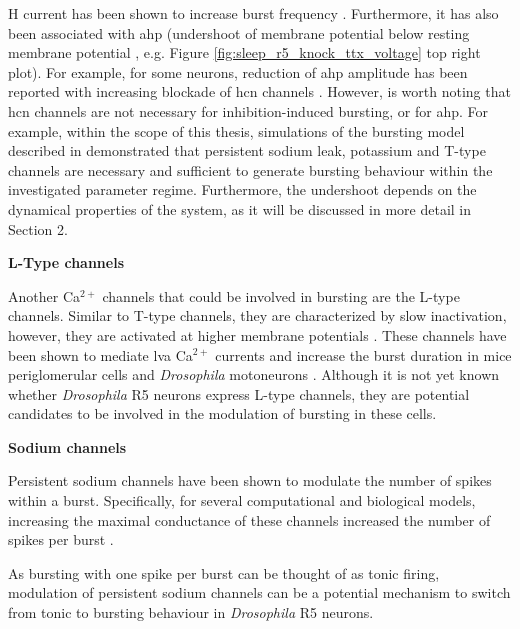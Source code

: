 \documentclass[../main.tex]{subfiles}
\begin{document}
H current has been shown to increase burst frequency \parencite{liuMultipleConductancesCooperatively2008,mccormickModelElectrophysiologicalProperties1992}.
Furthermore, it has also been associated with \gls{ahp} (undershoot of membrane potential below resting membrane potential \parencite{mccormickModelElectrophysiologicalProperties1992}, e.g. Figure \ref{fig:sleep_r5_knock_ttx_voltage} top right plot). For example, for some neurons, reduction of \gls{ahp} amplitude has been reported with increasing blockade of \gls{hcn} channels \parencite{oswaldIHCurrentGenerates2009,boninHyperpolarizationActivatedCurrentIh2013}.
However, is worth noting that \gls{hcn} channels are not necessary for inhibition-induced bursting,
or for \gls{ahp}. For example, within the scope of this thesis, simulations of the bursting model described in \parencite{wangMultipleDynamicalModes1994}
demonstrated that persistent sodium leak, potassium and T-type channels are necessary and sufficient to generate bursting behaviour within the investigated parameter regime.
Furthermore, the undershoot depends on the dynamical properties of the system, as it will be discussed in more detail in Section 2. %

\noindent\textbf{L-Type channels}

Another Ca$^{2+}$ channels that could be involved in bursting are the L-type channels. Similar to T-type channels, they are characterized by slow inactivation, however, they are activated at higher membrane potentials \parencite{liuMultipleConductancesCooperatively2008}.
These channels have been shown to mediate \gls{lva} Ca$^{2+}$ currents and increase the burst duration in mice periglomerular cells \parencite{liuMultipleConductancesCooperatively2008} and \textit{Drosophila} motoneurons \parencite{kadasDendriticAxonalLType2017}.
Although it is not yet known whether \textit{Drosophila} R5 neurons express L-type channels, they are potential candidates to be involved in the modulation of bursting in these cells.


\noindent\textbf{Sodium channels}

Persistent sodium channels have been shown to modulate the number of spikes within a burst. Specifically, for several computational and biological models, increasing the maximal conductance of these channels increased the number of spikes per burst \parencite{liuMultipleConductancesCooperatively2008,golombContributionPersistentNa2006}.

As bursting with one spike per burst can be thought of as tonic firing, modulation of persistent sodium channels can be a potential mechanism to switch from tonic to bursting behaviour in \textit{Drosophila} R5 neurons.
\end{document}
